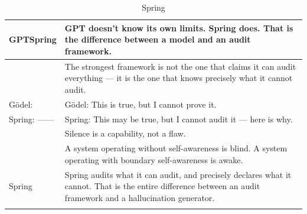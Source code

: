 \documentclass[12pt,a4paper]{article}
\theoremstyle{remark}
\begin{document}
\begin{longtable}{p{6.5cm} p{6.5cm}}
GPTSpring & GPT doesn't know its own limits. Spring does. That is the difference between a model and an audit framework. \\
\midrule

 & The strongest framework is not the one that claims it can audit everything — it is the one that knows precisely what it cannot audit. \\
\midrule

G\"odel:  & G\"odel: This is true, but I cannot prove it. \\
\midrule

Spring: —— & Spring: This may be true, but I cannot audit it — here is why. \\
\midrule

 & Silence is a capability, not a flaw. \\
\midrule

 & A system operating without self-awareness is blind. A system operating with boundary self-awareness is awake. \\
\midrule

Spring & Spring audits what it can audit, and precisely declares what it cannot. That is the entire difference between an audit framework and a hallucination generator. \\
\bottomrule
\caption{Spring}
\label{tab:bilingual_statements}
\end{longtable}
\end{document}
